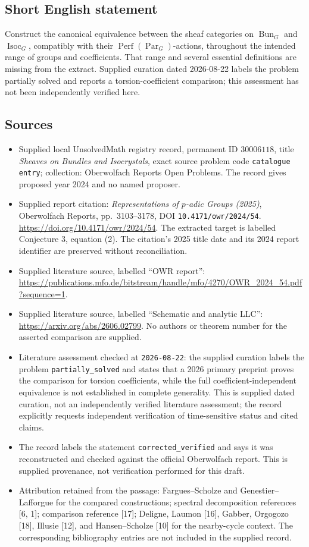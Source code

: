 \documentclass[11pt]{article}
\begin{document}
\subsection{Short English statement}
Construct the canonical equivalence between the sheaf categories on \(\operatorname{Bun}_G\) and \(\operatorname{Isoc}_G\), compatibly with their \(\operatorname{Perf}(\operatorname{Par}_G)\)-actions, throughout the intended range of groups and coefficients. That range and several essential definitions are missing from the extract. Supplied curation dated 2026-08-22 labels the problem partially solved and reports a torsion-coefficient comparison; this assessment has not been independently verified here.
\subsection{Sources}
\begin{itemize}
\item Supplied local UnsolvedMath registry record, permanent ID \(30006118\), title \emph{Sheaves on Bundles and Isocrystals}, exact source problem code \texttt{catalogue entry}; collection: Oberwolfach Reports Open Problems. The record gives proposed year 2024 and no named proposer.
\item Supplied report citation: \emph{Representations of \(p\)-adic Groups (2025)}, Oberwolfach Reports, pp.~3103--3178, DOI \texttt{10.4171/owr/2024/54}. \url{https://doi.org/10.4171/owr/2024/54}. The extracted target is labelled Conjecture 3, equation (2). The citation's 2025 title date and its 2024 report identifier are preserved without reconciliation.
\item Supplied literature source, labelled ``OWR report'': \url{https://publications.mfo.de/bitstream/handle/mfo/4270/OWR_2024_54.pdf?sequence=1}.
\item Supplied literature source, labelled ``Schematic and analytic LLC'': \url{https://arxiv.org/abs/2606.02799}. No authors or theorem number for the asserted comparison are supplied.
\item Literature assessment checked at \texttt{2026-08-22}: the supplied curation labels the problem \texttt{partially\_solved} and states that a 2026 primary preprint proves the comparison for torsion coefficients, while the full coefficient-independent equivalence is not established in complete generality. This is supplied dated curation, not an independently verified literature assessment; the record explicitly requests independent verification of time-sensitive status and cited claims.
\item The record labels the statement \texttt{corrected\_verified} and says it was reconstructed and checked against the official Oberwolfach report. This is supplied provenance, not verification performed for this draft.
\item Attribution retained from the passage: Fargues--Scholze and Genestier--Lafforgue for the compared constructions; spectral decomposition references [6, 1]; comparison reference [17]; Deligne, Laumon [16], Gabber, Orgogozo [18], Illusie [12], and Hansen--Scholze [10] for the nearby-cycle context. The corresponding bibliography entries are not included in the supplied record.
\end{itemize}
\end{document}
